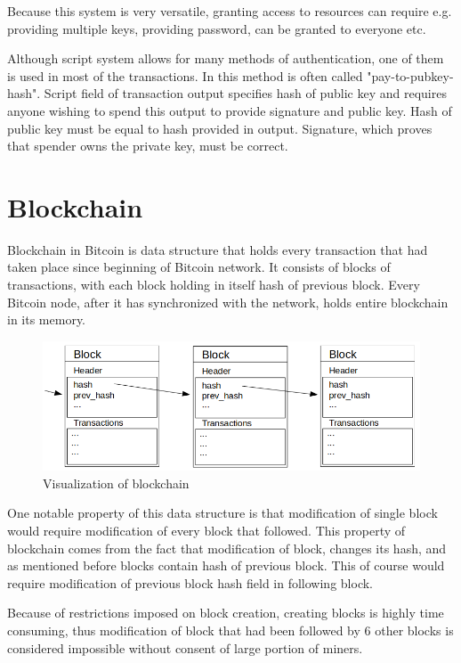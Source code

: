 \documentclass[12pt, en, eng, oneside]{mgr}
\begin{document}
Because this system is very versatile, granting access to resources can require e.g. providing multiple keys, providing password, can be granted to everyone etc. 

Although script system allows for many methods of authentication, one of them is used in most of the transactions. In this method is often called "pay-to-pubkey-hash". Script field of transaction output specifies hash of public key and requires anyone wishing to spend this output to provide signature and public key. Hash of public key must be equal to hash provided in output. Signature, which proves that spender owns the private key, must be correct.


\section{Blockchain}
Blockchain in Bitcoin is data structure that holds every transaction that had taken place since beginning of Bitcoin network. It consists of blocks of transactions, with each block holding in itself hash of previous block. Every Bitcoin node, after it has synchronized with the network, holds entire blockchain in its memory.

\begin{figure}[H]
  \includegraphics[width=0.8\linewidth]{blockchain.png}
  \caption{Visualization of blockchain}
  \label{fig:visualization-of-blockchain}
\end{figure}

One notable property of this data structure is that modification of single block would require modification of every block that followed. This property of blockchain comes from the fact that modification of block, changes its hash, and as mentioned before blocks contain hash of previous block. This of course would require modification of previous block hash field in following block. 

Because of restrictions imposed on block creation, creating blocks is highly time consuming, thus modification of block that had been followed by 6 other blocks is considered impossible without consent of large portion of miners.
\end{document}
